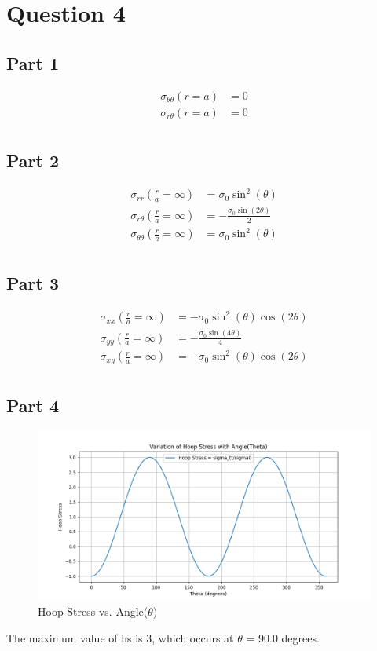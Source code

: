 \documentclass[12pt]{article} %
\begin{document}
\setlength{\parskip}{1em} 
\setlength{\parindent}{0pt}
\newcommand{\vect}[1]{\mathbf{#1}}
\section*{Question 4}
\subsection*{Part 1}
\begin{align*}
    \sigma_{\theta\theta}(r=a) &= 0\\
    \sigma_{r\theta}(r=a) &= 0\\
\end{align*}
\subsection*{Part 2}
\begin{align*}
    \sigma_{rr}(\frac{r}{a}=\infty ) &= \sigma_{0} \sin^{2}{\left(\theta \right)}\\
    \sigma_{r\theta}(\frac{r}{a}=\infty ) &= - \frac{\sigma_{0} \sin{\left(2 \theta \right)}}{2}\\
    \sigma_{\theta\theta}(\frac{r}{a}=\infty ) &= \sigma_{0} \sin^{2}{\left(\theta \right)}\\
\end{align*}
\subsection*{Part 3}
\begin{align*}
    \sigma_{xx}(\frac{r}{a}=\infty ) &= - \sigma_{0} \sin^{2}{\left(\theta \right)} \cos{\left(2 \theta \right)}\\
    \sigma_{yy}(\frac{r}{a}=\infty ) &= - \frac{\sigma_{0} \sin{\left(4 \theta \right)}}{4}\\
    \sigma_{xy}(\frac{r}{a}=\infty ) &= - \sigma_{0} \sin^{2}{\left(\theta \right)} \cos{\left(2 \theta \right)}\\
\end{align*}
\newpage
\subsection*{Part 4}
\begin{figure}[ht]
    \centering
    \includegraphics[width=1\textwidth]{Hoop Stress.png}
    \caption{Hoop Stress vs. Angle($\theta$)}
\end{figure}
The maximum value of hs is 3, which occurs at $\theta$ = 90.0 degrees.
\end{document}
